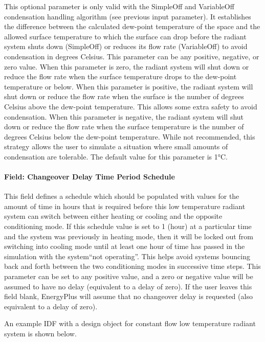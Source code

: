 This optional parameter is only valid with the SimpleOff and VariableOff condensation handling algorithm (see previous input parameter). It establishes the difference between the calculated dew-point temperature of the space and the allowed surface temperature to which the surface can drop before the radiant system shuts down (SimpleOff) or reduces its flow rate (VariableOff) to avoid condensation in degrees Celsius. This parameter can be any positive, negative, or zero value. When this parameter is zero, the radiant system will shut down or reduce the flow rate when the surface temperature drops to the dew-point temperature or below. When this parameter is positive, the radiant system will shut down or reduce the flow rate when the surface is the number of degrees Celsius above the dew-point temperature. This allows some extra safety to avoid condensation. When this parameter is negative, the radiant system will shut down or reduce the flow rate when the surface temperature is the number of degrees Celsius below the dew-point temperature. While not recommended, this strategy allows the user to simulate a situation where small amounts of condensation are tolerable.  The default value for this parameter is 1°C.

\paragraph{Field: Changeover Delay Time Period Schedule}\label{field-changeover-delay-time-period-schedule-1}

This field defines a schedule which should be populated with values for the amount of time in hours that is required before this low temperature radiant system can switch between either heating or cooling and the opposite conditioning mode.  If this schedule value is set to 1 (hour) at a particular time and the system was previously in heating mode, then it will be locked out from switching into cooling mode until at least one hour of time has passed in the simulation with the system``not operating''.  This helps avoid systems bouncing back and forth between the two conditioning modes in successive time steps.  This parameter can be set to any positive value, and a zero or negative value will be assumed to have no delay (equivalent to a delay of zero).  If the user leaves this field blank, EnergyPlus will assume that no changeover delay is requested (also equivalent to a delay of zero).

An example IDF with a design object for constant flow low temperature radiant system is shown below.

